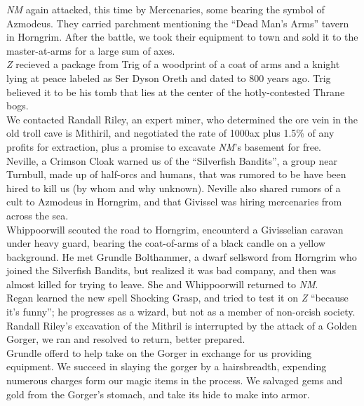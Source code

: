 \documentclass[letterpaper]{article}
\begin{document}
\noindent \emph{NM} again attacked, this time by Mercenaries, some bearing the symbol of Azmodeus.  They carried parchment mentioning the ``Dead Man's Arms'' tavern in Horngrim.  After the battle, we took their equipment to town and sold it to the master-at-arms for a large sum of axes.\\

\noindent \emph{Z} recieved a package from Trig of a woodprint of a coat of arms and a knight lying at peace labeled as Ser Dyson Oreth and dated to 800 years ago.  Trig believed it to be his tomb that lies at the center of the hotly-contested Thrane bogs.\\

\noindent We contacted Randall Riley, an expert miner, who determined the ore vein in the old troll cave is Mithiril, and negotiated the rate of 1000ax plus 1.5\% of any profits for extraction, plus a promise to excavate \emph{NM}'s basement for free.\\

\noindent Neville, a Crimson Cloak warned us of the ``Silverfish Bandits'', a group near Turnbull, made up of half-orcs and humans, that was rumored to be have been hired to kill us (by whom and why unknown). Neville also shared rumors of a cult to Azmodeus in Horngrim, and that Givissel was hiring mercenaries from across the sea.\\

\noindent Whippoorwill scouted the road to Horngrim, encounterd a Givisselian caravan under heavy guard, bearing the coat-of-arms of a black candle on a yellow background.  He met Grundle Bolthammer, a dwarf sellsword from Horngrim who joined the Silverfish Bandits, but realized it was bad company, and then was almost killed for trying to leave. She and Whippoorwill returned to \emph{NM}.\\

\noindent Regan learned the new spell Shocking Grasp, and tried to test it on \emph{Z} ``because it's funny''; he progresses as a wizard, but not as a member of non-orcish society.\\

\noindent Randall Riley's excavation of the Mithril is interrupted by the attack of a Golden Gorger, we ran and resolved to return, better prepared.\\

\noindent Grundle offerd to help take on the Gorger in exchange for us providing equipment. We succeed in slaying the gorger by a hairsbreadth, expending numerous charges form our magic items in the process. We salvaged gems and gold from the Gorger's stomach, and take its hide to make into armor.\\
\end{document}
